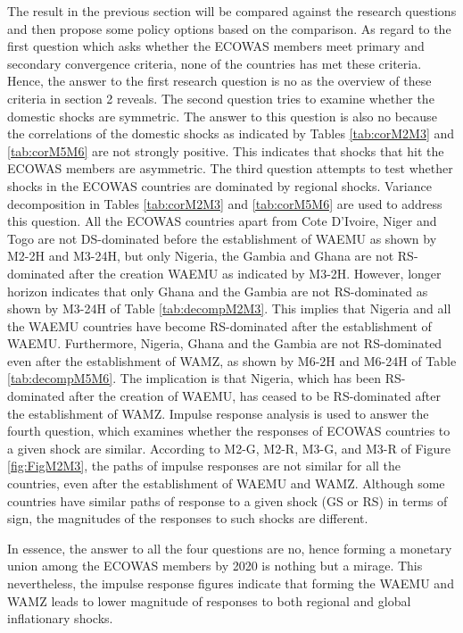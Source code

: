\documentclass[]{article}
\begin{document}
The result in the previous section will be compared against the research questions and then propose some policy options based on the comparison. As regard to the first question which asks whether the ECOWAS members meet primary and secondary convergence criteria, none of the countries has met these criteria. Hence, the answer to the first research question is no as the overview of these criteria in section 2 reveals. The second question tries to examine whether the domestic shocks are symmetric. The answer to this question is also no because the correlations of the domestic shocks as indicated by Tables \ref{tab:corM2M3} and \ref{tab:corM5M6} are not strongly positive. This indicates that shocks that hit the ECOWAS members are asymmetric. The third question attempts to test whether shocks in the ECOWAS countries are dominated by regional shocks. Variance decomposition in Tables \ref{tab:corM2M3} and \ref{tab:corM5M6} are used to address this question. All the ECOWAS countries apart from Cote D'Ivoire, Niger and Togo are not DS-dominated before the establishment of WAEMU as shown by M2-2H and M3-24H, but only Nigeria, the Gambia and Ghana are not RS-dominated after the creation WAEMU as indicated by M3-2H. However, longer horizon indicates that only Ghana and the Gambia are not RS-dominated as shown by M3-24H of Table \ref{tab:decompM2M3}. This implies that Nigeria and all the WAEMU countries have become RS-dominated after the establishment of WAEMU. Furthermore, Nigeria, Ghana and the Gambia are not RS-dominated even after the establishment of WAMZ, as shown by M6-2H and M6-24H of Table \ref{tab:decompM5M6}. The implication is that Nigeria, which has been RS-dominated after the creation of WAEMU, has ceased to be RS-dominated after the establishment of WAMZ. Impulse response analysis is used to answer the fourth question, which examines whether the responses of ECOWAS countries to a given shock are similar. According to M2-G, M2-R, M3-G, and M3-R of Figure \ref{fig:FigM2M3}, the paths of impulse responses are not similar for all the countries, even after the establishment of WAEMU and WAMZ. Although some countries have similar paths of response to a given shock (GS or RS) in terms of sign, the magnitudes of the responses to such shocks are different.

In essence, the answer to all the four questions are no, hence forming a monetary union among the ECOWAS members by 2020 is nothing but a mirage. This nevertheless, the impulse response figures indicate that forming the WAEMU and WAMZ leads to lower magnitude of responses to both regional and global inflationary shocks.
\end{document}
